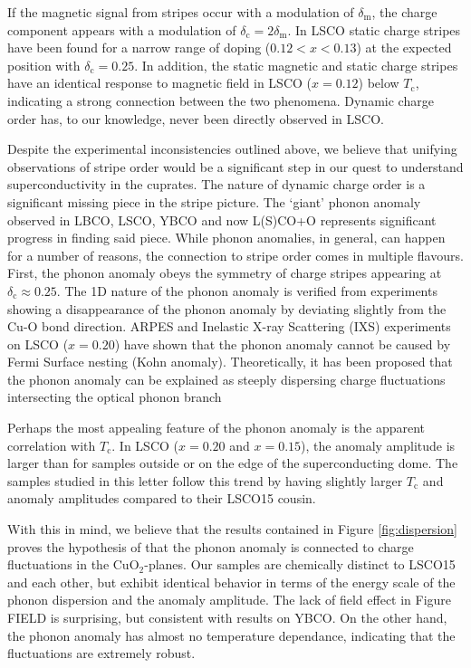 If the magnetic signal from stripes occur with a modulation of $\delta_\text{m}$, the charge component appears with a modulation of $\delta_\text{c} = 2\delta_\text{m}$. In LSCO static charge stripes have been found for a narrow range of doping ($0.12 < x < 0.13$)\cite{Thampy2014, Croft2014} at the expected position with $\delta_\text{c} = 0.25$. In addition, the static magnetic and static charge stripes have an identical response to magnetic field in LSCO ($x=0.12$) below $T_\text{c}$, indicating a strong connection between the two phenomena\cite{Christensen2014}. Dynamic charge order has, to our knowledge, never been directly observed in LSCO.

Despite the experimental inconsistencies outlined above, we believe that unifying observations of stripe order would be a significant step in our quest to understand superconductivity in the cuprates. The nature of dynamic charge order is a significant missing piece in the stripe picture. The `giant' phonon anomaly observed in LBCO, LSCO, YBCO and now L(S)CO+O represents significant progress in finding said piece. While phonon anomalies, in general, can happen for a number of reasons, the connection to stripe order comes in multiple flavours\cite{Reznik2012}. First, the phonon anomaly obeys the symmetry of charge stripes appearing at $\delta_\text{c} \approx 0.25$. The 1D nature of the phonon anomaly is verified from experiments showing a disappearance of the phonon anomaly by deviating slightly from the Cu-O bond direction. ARPES and Inelastic X-ray Scattering (IXS) experiments on LSCO ($x=0.20$)\cite{Park2014} have shown that the phonon anomaly cannot be caused by Fermi Surface nesting (Kohn anomaly). Theoretically, it has been proposed that the phonon anomaly can be explained as steeply dispersing charge fluctuations intersecting the optical phonon branch\cite{Kaneshita2002}

Perhaps the most appealing feature of the phonon anomaly is the apparent correlation with $T_\text{c}$. In LSCO ($x=0.20$ and $x=0.15$), the anomaly amplitude is larger than for samples outside or on the edge of the superconducting dome. The samples studied in this letter follow this trend by having slightly larger $T_\text{c}$ and anomaly amplitudes compared to their LSCO15 cousin.

With this in mind, we believe that the results contained in Figure \ref{fig:dispersion} proves the hypothesis of \citeauthor{Reznik2012} \cite{Reznik2012} that the phonon anomaly is connected to charge fluctuations in the CuO$_2$-planes. Our samples are chemically distinct to LSCO15 and each other, but exhibit identical behavior in terms of the energy scale of the phonon dispersion and the anomaly amplitude. The lack of field effect in Figure FIELD is surprising, but consistent with results on YBCO. On the other hand, the phonon anomaly has almost no temperature dependance, indicating that the fluctuations are extremely robust.

